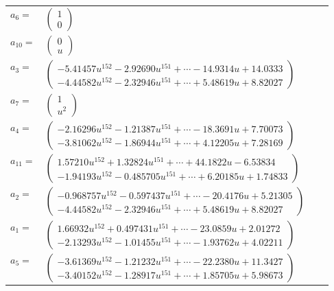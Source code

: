 \documentclass[1p]{elsarticle_modified}
\theoremstyle{definition}
\begin{document}
\begin{tabular}{m{7pt} m{180pt} m{7pt} m{180pt} }
\flushright $a_{6}=$&$\begin{pmatrix}1\\0\end{pmatrix}$ \\
\flushright $a_{10}=$&$\begin{pmatrix}0\\u\end{pmatrix}$ \\
\flushright $a_{3}=$&$\begin{pmatrix}-5.41457 u^{152}-2.92690 u^{151}+\cdots-14.9314 u+14.0333\\-4.44582 u^{152}-2.32946 u^{151}+\cdots+5.48619 u+8.82027\end{pmatrix}$ \\
\flushright $a_{7}=$&$\begin{pmatrix}1\\u^2\end{pmatrix}$ \\
\flushright $a_{4}=$&$\begin{pmatrix}-2.16296 u^{152}-1.21387 u^{151}+\cdots-18.3691 u+7.70073\\-3.81062 u^{152}-1.86944 u^{151}+\cdots+4.12205 u+7.28169\end{pmatrix}$ \\
\flushright $a_{11}=$&$\begin{pmatrix}1.57210 u^{152}+1.32824 u^{151}+\cdots+44.1822 u-6.53834\\-1.94193 u^{152}-0.485705 u^{151}+\cdots+6.20185 u+1.74833\end{pmatrix}$ \\
\flushright $a_{2}=$&$\begin{pmatrix}-0.968757 u^{152}-0.597437 u^{151}+\cdots-20.4176 u+5.21305\\-4.44582 u^{152}-2.32946 u^{151}+\cdots+5.48619 u+8.82027\end{pmatrix}$ \\
\flushright $a_{1}=$&$\begin{pmatrix}1.66932 u^{152}+0.497431 u^{151}+\cdots-23.0859 u+2.01272\\-2.13293 u^{152}-1.01455 u^{151}+\cdots-1.93762 u+4.02211\end{pmatrix}$ \\
\flushright $a_{5}=$&$\begin{pmatrix}-3.61369 u^{152}-1.21232 u^{151}+\cdots-22.2380 u+11.3427\\-3.40152 u^{152}-1.28917 u^{151}+\cdots+1.85705 u+5.98673\end{pmatrix}$ \\

\end{tabular}
\end{document}
